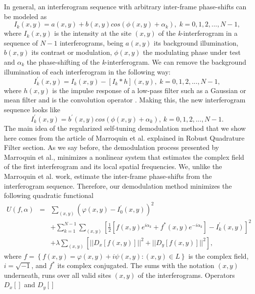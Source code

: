 In general, an interferogram sequence with arbitrary inter-frame phase-shifts
can be modeled as 
\begin{equation}
I_{k}(x,y)=a(x,y)+b(x,y)cos(\phi(x,y)+\alpha_{k}),\; k=0,1,2,...,N-1,\label{eq:
Ik}
\end{equation}
where $I_{k}(x,y)$ is the intensity at the site $(x,y)$ of the
\emph{k}-interferogram in a sequence of $N-1$ interferograms, being
$a(x,y)$ its background illumination, $b(x,y)$ its contrast or modulation,
$\phi(x,y)$ the modulating phase under test and $\alpha_{k}$ the
phase-shifting of the \emph{k}-interferogram. We can remove the background
illumination of each interferogram in the following way: 
\begin{equation}
I_{k}^{'}(x,y)=I_{k}(x,y)-[I_{k}*h](x,y),\; k=0,1,2,...,N-1,\label{eq:I'}
\end{equation}
where $h(x,y)$ is the impulse response of a low-pass filter such
as a Gaussian or mean filter and \textasteriskcentered{} is the convolution
operator \cite{Jahne}. Making this, the new interferogram sequence looks
like 
\begin{equation}
I_{k}^{'}(x,y)=b^{'}(x,y)cos(\phi(x,y)+\alpha_{k}),\: k=0,1,2,...,N-1.\label{eq:
I'2}
\end{equation}
The main idea of the regularized self-tuning demodulation method that
we show here comes from the article of Marroquin et al. \cite{RQF} explained in
Robust Quadrature Filter section. As we say before, 
the demodulation process presented by Marroquin et al., minimizes
a nonlinear system that estimates the complex field of the first interferogram
and its local spatial frequencies. We, unlike the Marroquin et al.
work, estimate the inter-frame phase-shifts from the interferogram
sequence. Therefore, our demodulation method minimizes the following
quadratic functional
\begin{eqnarray}
U(f,\alpha) & = & \sum_{(x,y)}(\varphi(x,y)-I_{0}^{'}(x,y))^{2}\nonumber \\
& &+\sum_{k=1}^{N-1}
\sum_{(x,y)}[\frac{1}{2}[f(x,y)e^{i\alpha_{k}}+f^{*}(x,y)e^{-i\alpha_{k}}]-I_{k}
^{'}(x,y)]^{2}\label{eq:U}\\
 &  & +\lambda\sum_{(x,y)}[||D_{x}[f(x,y)]||^{2}+||D_{y}[f(x,y)]||^{2}],\nonumber 
\end{eqnarray}
where $f=\left\{ f(x,y)=\varphi(x,y)+i\psi(x,y):(x,y)\in L\right\} $
is the complex field, $i=\sqrt{-1}$, and $f^{*}$ its complex conjugated.
The sums with the notation $(x,y)$ underneath, runs over all valid
sites $(x,y)$ of the interferograms. Operators $D_{x}[]$ and $D_{y}[]$
